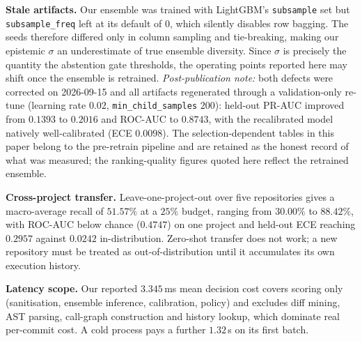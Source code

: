 \documentclass[sigconf,screen]{acmart}
\begin{document}
\textbf{Stale artifacts.} Our ensemble was trained with LightGBM's \texttt{subsample} set but \texttt{subsample\_freq} left at its default of $0$, which silently disables row bagging. The seeds therefore differed only in column sampling and tie-breaking, making our epistemic $\sigma$ an underestimate of true ensemble diversity. Since $\sigma$ is precisely the quantity the abstention gate thresholds, the operating points reported here may shift once the ensemble is retrained. \emph{Post-publication note:} both defects were corrected on 2026-09-15 and all artifacts regenerated through a validation-only re-tune (learning rate $0.02$, \texttt{min\_child\_samples} $200$): held-out PR-AUC improved from $0.1393$ to $0.2016$ and ROC-AUC to $0.8743$, with the recalibrated model natively well-calibrated (ECE $0.0098$). The selection-dependent tables in this paper belong to the pre-retrain pipeline and are retained as the honest record of what was measured; the ranking-quality figures quoted here reflect the retrained ensemble.

\textbf{Cross-project transfer.} Leave-one-project-out over five repositories gives a macro-average recall of $51.57\%$ at a $25\%$ budget, ranging from $30.00\%$ to $88.42\%$, with ROC-AUC below chance ($0.4747$) on one project and held-out ECE reaching $0.2957$ against $0.0242$ in-distribution. Zero-shot transfer does not work; a new repository must be treated as out-of-distribution until it accumulates its own execution history.

\textbf{Latency scope.} Our reported $3.345$\,ms mean decision cost covers scoring only (sanitisation, ensemble inference, calibration, policy) and excludes diff mining, AST parsing, call-graph construction and history lookup, which dominate real per-commit cost. A cold process pays a further $1.32$\,s on its first batch.
\end{document}
